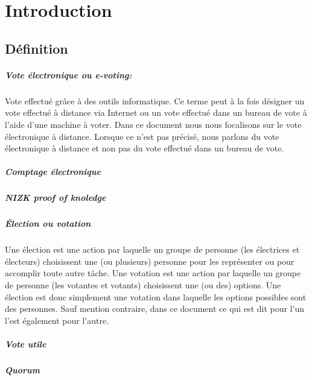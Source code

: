 \documentclass[../report]{subfiles}
\begin{document}
  \chapter{Introduction}

  \section{Définition}

  \paragraph{Vote électronique ou e-voting:}
  Vote effectué grâce à des outils informatique.
  Ce terme peut à la fois désigner un vote effectué à distance via Internet ou un vote effectué
  dans un bureau de vote à l'aide d'une machine à voter.
  Dans ce document nous nous focalisons sur le vote électronique à distance.
  Lorsque ce n'est pas précisé, nous parlons du vote électronique à distance et non pas du vote effectué dans un bureau de vote.

  \paragraph{Comptage électronique}
  \todo{}
  
  \paragraph{NIZK proof of knoledge}
  \todo{}

  \paragraph{Élection ou votation}
  Une élection est une action par laquelle un groupe de personne (les électrices et électeurs) choisissent une (ou plusieurs) personne
  pour les représenter ou pour accomplir toute autre tâche.
  Une votation est une action par laquelle un groupe de personne (les votantes et votants) choisissent une (ou des) options.
  Une élection est donc simplement une votation dans laquelle les options possibles sont des personnes.
  Sauf mention contraire, dans ce document ce qui est dit pour l'un l'est également pour l'autre.

  \paragraph{Vote utile}
  \todo{}
  \paragraph{Quorum}
  \todo{}
\end{document}
